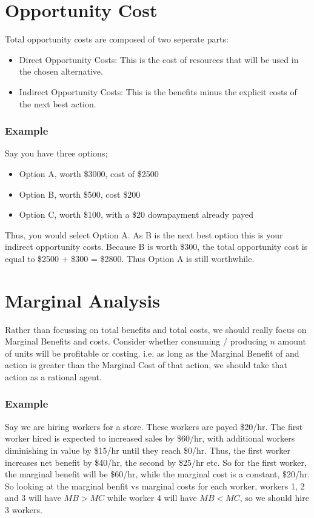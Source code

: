 \documentclass[12pt]{report}
\begin{document}
\section*{Opportunity Cost}
Total opportunity costs are composed of two seperate parts:
\begin{itemize}
    \item Direct Opportunity Costs: This is the cost of resources that will be used in the chosen alternative.
    \item Indirect Opportunity Costs: This is the benefits minus the explicit costs of the next best action.
\end{itemize}

\subsubsection*{Example}
Say you have three options;
\begin{itemize}
    \item Option A, worth \$3000, cost of \$2500
    \item Option B, worth \$500, cost \$200
    \item Option C, worth \$100, with a \$20 downpayment already payed
\end{itemize}
Thus, you would select Option A. As B is the next best option
this is your indirect opportunity costs. Because B is worth \$300, the total opportunity cost is equal
to \$2500 + \$300 = \$2800. Thus Option A is still worthwhile.

\section*{Marginal Analysis}
Rather than focussing on total benefits and total costs, we should really focus on Marginal Benefits
and costs. Consider whether consuming / producing \(n\) amount of units will be profitable or costing.
i.e. as long as the Marginal Benefit of and action is greater than the Marginal Cost of that action,
we should take that action as a rational agent.

\subsubsection*{Example}
Say we are hiring workers for a store. These workers are payed \$20/hr. The first worker hired is expected
to increased sales by \$60/hr, with additional workers diminishing in value by \$15/hr until they reach \$0/hr.
Thus, the first worker increases net benefit by \$40/hr, the second by \$25/hr etc. So for the first worker,
the marginal benefit will be \$60/hr, while the marginal cost is a constant, \$20/hr. So looking at the marginal 
benfit vs marginal costs for each worker, workers 1, 2 and 3 will have \(MB > MC\) while worker 4 will have \(MB < MC\), so 
we should hire 3 workers.
\end{document}
